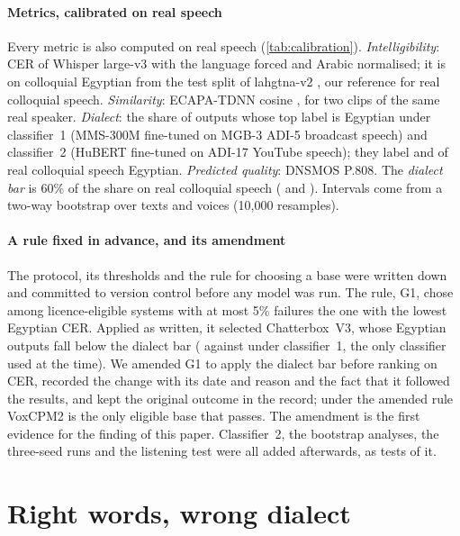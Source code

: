 \documentclass[11pt]{article}
\newcommand{\vox}{VoxCPM2\xspace}
\newcommand{\cbthree}{Chatterbox~V3\xspace}
\begin{document}
\paragraph{Metrics, calibrated on real speech}
Every metric is also computed on real speech (\cref{tab:calibration}). \emph{Intelligibility}: CER of Whisper large-v3
\citep{radford2023whisper} with the language forced and Arabic normalised; it is  on colloquial
Egyptian from the test split of lahgtna-v2 \citep{oddadmix2026lahgtnadata}, our reference for real colloquial speech.
\emph{Similarity}: ECAPA-TDNN cosine \citep{desplanques2020ecapa},  for two clips of the same real
speaker. \emph{Dialect}: the share of outputs whose top label is Egyptian under classifier~1 (MMS-300M fine-tuned on
MGB-3 ADI-5 broadcast speech) and classifier~2 (HuBERT fine-tuned on ADI-17 YouTube speech); they label
 and  of real colloquial speech Egyptian. \emph{Predicted quality}: DNSMOS P.808.
The \emph{dialect bar} is 60\% of the share on real colloquial speech ( and ). Intervals come
from a two-way bootstrap over texts and voices (10,000 resamples).

\paragraph{A rule fixed in advance, and its amendment}
The protocol, its thresholds and the rule for choosing a base were written down and committed to version control before any model was run. The rule,
G1, chose among licence-eligible systems with at most 5\% failures the one with the lowest Egyptian CER. Applied as
written, it selected \cbthree, whose Egyptian outputs fall below the dialect bar ( against
 under classifier~1, the only classifier used at the time). We amended G1 to apply the dialect bar before
ranking on CER, recorded the change with its date and reason and the fact that it followed the results, and kept the
original outcome in the record; under the amended rule \vox is the only eligible base that passes. The amendment is the
first evidence for the finding of this paper. Classifier~2, the bootstrap analyses, the three-seed runs and the listening
test were all added afterwards, as tests of it.

\section{Right words, wrong dialect}\label{sec:dissociation}
\end{document}
